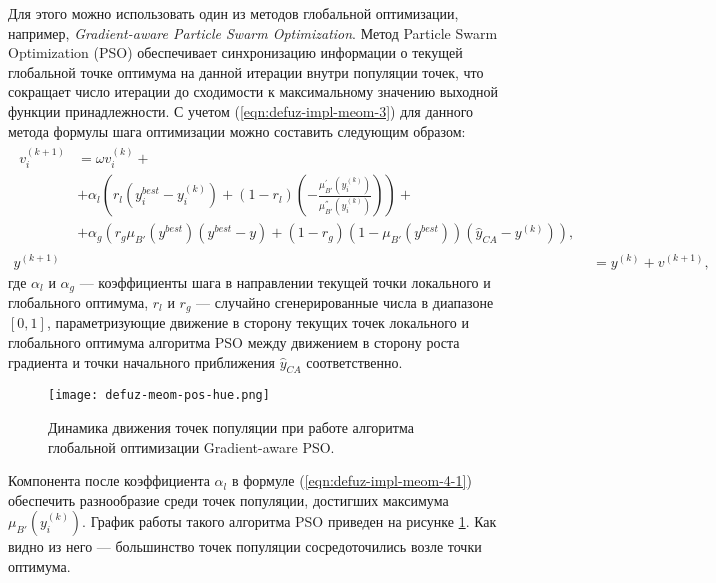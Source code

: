 Для этого можно использовать один из методов глобальной оптимизации, например, \textit{Gradient-aware Particle Swarm Optimization}. Метод Particle Swarm Optimization (PSO) обеспечивает синхронизацию информации о текущей глобальной точке оптимума на данной итерации внутри популяции точек, что сокращает число итерации до сходимости к максимальному значению выходной функции принадлежности. С учетом (\ref{eqn:defuz-impl-meom-3}) для данного метода формулы шага оптимизации можно составить следующим образом:
\begin{align}
	\begin{split}
		v_i^{(k+1)} &= \omega v_i^{(k)} +\\
		&+ \alpha_l \left(
			r_l\left(
				y_i^{best} - y_i^{(k)}
			\right) + (1-r_l)\left(
				-\frac{\mu_{B'}^{'}(y_i^{(k)})}{\mu_{B'}^{''}(y_i^{(k)})}
			\right)
		\right) + \\
		&+ \alpha_g \left(
			r_g \mu_{B'}(y^{best})\left(
				y^{best}-y
			\right) + (1-r_g) \left(
				1-\mu_{B'}(y^{best})
			\right) \left(
				\hat{y}_{CA} - y^{(k)}
			\right)
		\right), \label{eqn:defuz-impl-meom-4-1}
	\end{split}\\
	y^{(k+1)} &= y^{(k)} + v^{(k+1)}, \nonumber
\end{align}
где $\alpha_l$ и $\alpha_g$ --- коэффициенты шага в направлении текущей точки локального и глобального оптимума, $r_l$ и $r_g$ --- случайно сгенерированные числа в диапазоне $[0,1]$, параметризующие движение в сторону текущих точек локального и глобального оптимума алгоритма PSO между движением в сторону роста градиента и точки начального приближения $\hat{y}_{CA}$ соответственно.

\begin{figure}[ht]
	\centering
	\texttt{[image: defuz-meom-pos-hue.png]}
	\caption{Динамика движения точек популяции при работе алгоритма глобальной оптимизации Gradient-aware PSO.}
	\label{fig:defuz-meom-pso-hue}
\end{figure}

Компонента после коэффициента $\alpha_l$ в формуле (\ref{eqn:defuz-impl-meom-4-1}) обеспечить разнообразие среди точек популяции, достигших максимума $\mu_{B'}(y_i^{(k)})$. График работы такого алгоритма PSO приведен на рисунке \cref{fig:defuz-meom-pso-hue}. Как видно из него --- большинство точек популяции сосредоточились возле точки оптимума.

